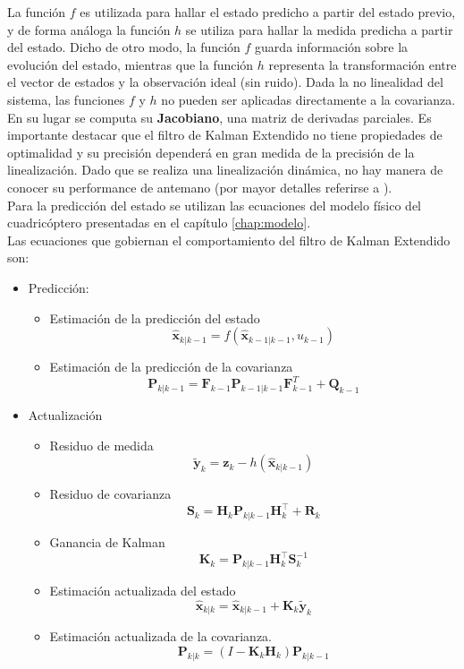 \documentclass[main]{subfiles}
\begin{document}
La función $f$ es utilizada para hallar el estado predicho a partir del estado previo, y de forma análoga la función $h$ se utiliza para hallar la medida predicha a partir del estado. Dicho de otro modo, la función $f$ guarda información sobre la evolución del estado, mientras que la función $h$ representa la transformación entre el vector de estados y la observación ideal (sin ruido). Dada la no linealidad del sistema, las funciones $f$ y $h$ no pueden ser aplicadas directamente a la covarianza. En su lugar se computa su \textbf{Jacobiano}, una matriz de derivadas parciales. Es importante destacar que el filtro de Kalman Extendido no tiene propiedades de optimalidad y su precisión dependerá en gran medida de la precisión de la linealización. Dado que se realiza una linealización dinámica, no hay manera de conocer su performance de antemano (por mayor detalles referirse a \cite{bib:kay}).\\
Para la predicción del estado se utilizan las ecuaciones del modelo físico del cuadricóptero presentadas en el capítulo \ref{chap:modelo}.\\

Las ecuaciones que gobiernan el comportamiento del filtro de Kalman Extendido son:
\begin{itemize}
	\item Predicción:
	\begin{itemize}
		\item Estimación de la predicción del estado
		$$\hat{\mathbf{x}}_{k|k-1} = f(\hat{\mathbf{x}}_{k-1|k-1}, u_{k-1})$$
		\item Estimación de la predicción de la covarianza
		$$ \mathbf{P}_{k|k-1} =  {{\mathbf{F}_{k-1}}} \mathbf{P}_{k-1|k-1}{  {\mathbf{F}_{k-1}^T}} + \mathbf{Q}_{k-1} $$		
	\end{itemize}
	\item Actualización
	\begin{itemize}
		\item Residuo de medida
		$$\tilde{\mathbf{y}}_{k} = \mathbf{z}_{k} - h(\hat{\mathbf{x}}_{k|k-1})$$
		\item Residuo de covarianza
		$$\mathbf{S}_{k} = { \mathbf{H}_{k}}\mathbf{P}_{k|k-1}{ \mathbf{H}_{k}^\top} + \mathbf{R}_{k}$$
		\item Ganancia de Kalman
		$$\mathbf{K}_{k} = \mathbf{P}_{k|k-1}{ \mathbf{H}_{k}^\top}\mathbf{S}_{k}^{-1} $$
		\item Estimación actualizada del estado
		$$\hat{\mathbf{x}}_{k|k} = \hat{\mathbf{x}}_{k|k-1} + \mathbf{K}_{k}\tilde{\mathbf{y}}_{k} $$
		\item Estimación actualizada de la covarianza.
		$$ \mathbf{P}_{k|k} = (I - \mathbf{K}_{k} { \mathbf{H}_{k}}) \mathbf{P}_{k|k-1} $$		
	\end{itemize}
\end{itemize}
\end{document}
